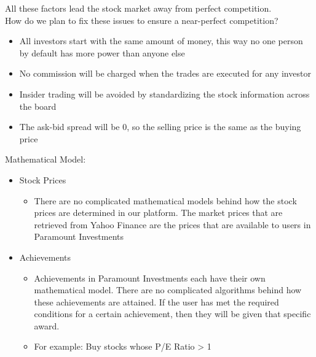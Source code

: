 All these factors lead the stock market away from perfect competition.\\

How do we plan to fix these issues to ensure a near-perfect competition?

\begin{itemize}
\item
All investors start with the same amount of money, this way no one person by default
has more power than anyone else
\item
No commission will be charged when the trades are executed for any investor
\item
Insider trading will be avoided by standardizing the stock information across the board
\item
The ask-bid spread will be 0, so the selling price is the same as the buying price
\end{itemize}

Mathematical Model:

\begin{itemize}
\item
Stock Prices
\begin{itemize}
\item
There are no complicated mathematical models behind how the stock prices are
determined in our platform.  The market prices that are retrieved from Yahoo Finance
are the prices that are available to users in Paramount Investments
\end{itemize}
\item
Achievements
\begin{itemize}
\item
Achievements in Paramount Investments each have their own mathematical model.
There are no complicated algorithms behind how these achievements are attained.
If the user has met the required conditions for a certain achievement, then they
will be given that specific award.
\item
For example: Buy stocks whose P/E Ratio > 1
\end{itemize}
\end{itemize}

